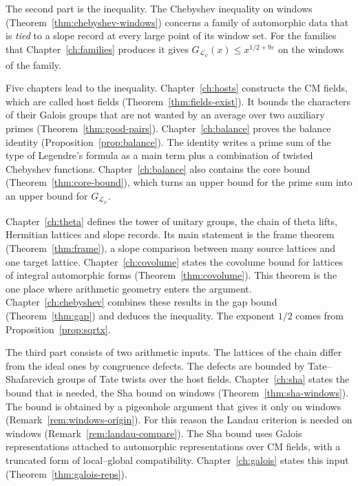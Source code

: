 \documentclass[11pt]{amsbook}
\theoremstyle{plain}
\theoremstyle{definition}
\theoremstyle{remark}
\numberwithin{equation}{section}
\numberwithin{figure}{chapter}
\numberwithin{table}{chapter}
\newcommand{\eps}{\varepsilon}
\newcommand{\lev}{\mathscr{L}}
\begin{document}
The second part is the inequality. The Chebyshev inequality on
windows (Theorem~\ref{thm:chebyshev-windows}) concerns a family of
automorphic data that is \emph{tied} to a slope record at every
large point of its window set. For the families that
Chapter~\ref{ch:families} produces it gives
$G_{\lev_\psi}(x)\le x^{1/2+9\eps}$ on the windows of the family.

Five chapters lead to the inequality.
Chapter~\ref{ch:hosts} constructs the CM fields, which are called
host fields (Theorem~\ref{thm:fields-exist}). It bounds the
characters of their Galois groups that are not wanted by an
average over two auxiliary primes
(Theorem~\ref{thm:good-pairs}). Chapter~\ref{ch:balance} proves
the balance identity (Proposition~\ref{prop:balance}). The
identity writes a prime sum of the type of Legendre's formula as a
main term plus a combination of twisted Chebyshev functions.
Chapter~\ref{ch:balance} also contains the core bound
(Theorem~\ref{thm:core-bound}), which turns an upper bound for the
prime sum into an upper bound for $G_{\lev_\psi}$.

Chapter~\ref{ch:theta} defines the tower of unitary groups, the
chain of theta lifts, Hermitian lattices and slope records. Its
main statement is the frame theorem (Theorem~\ref{thm:frame}), a
slope comparison between many source lattices and one target
lattice. Chapter~\ref{ch:covolume} states the covolume bound for
lattices of integral automorphic forms
(Theorem~\ref{thm:covolume}). This theorem is the one place where
arithmetic geometry enters the argument.
Chapter~\ref{ch:chebyshev} combines these results in the gap bound
(Theorem~\ref{thm:gap}) and deduces the inequality. The exponent
$1/2$ comes from Proposition~\ref{prop:sqrtx}.

The third part consists of two arithmetic inputs. The lattices of
the chain differ from the ideal ones by congruence defects. The
defects are bounded
by Tate--Shafarevich groups of Tate twists over the host fields.
Chapter~\ref{ch:sha} states the bound that is needed, the Sha
bound on windows (Theorem~\ref{thm:sha-windows}). The bound is
obtained by a pigeonhole argument that gives it only on windows
(Remark~\ref{rem:windows-origin}). For this reason the
Landau criterion is needed on windows
(Remark~\ref{rem:landau-compare}). The Sha bound uses Galois
representations attached to automorphic representations over CM
fields, with a truncated form of local--global compatibility.
Chapter~\ref{ch:galois} states this input
(Theorem~\ref{thm:galois-reps}).
\end{document}
